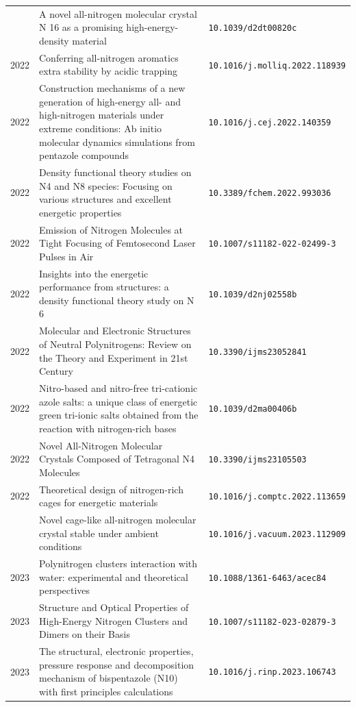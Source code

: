 \begin{longtable}{@{}p{1.0cm}p{10.5cm}p{3.5cm}@{}}
\addlinespace
2022 & A novel all-nitrogen molecular crystal N 16 as a promising high-energy-density material & \small\texttt{10.1039/d2dt00820c} \\
2022 & Conferring all-nitrogen aromatics extra stability by acidic trapping & \small\texttt{10.1016/j.molliq.2022.118939} \\
2022 & Construction mechanisms of a new generation of high-energy all- and high-nitrogen materials under extreme conditions: Ab initio molecular dynamics simulations from pentazole compounds & \small\texttt{10.1016/j.cej.2022.140359} \\
2022 & Density functional theory studies on N4 and N8 species: Focusing on various structures and excellent energetic properties & \small\texttt{10.3389/fchem.2022.993036} \\
2022 & Emission of Nitrogen Molecules at Tight Focusing of Femtosecond Laser Pulses in Air & \small\texttt{10.1007/s11182-022-02499-3} \\
2022 & Insights into the energetic performance from structures: a density functional theory study on N 6 & \small\texttt{10.1039/d2nj02558b} \\
2022 & Molecular and Electronic Structures of Neutral Polynitrogens: Review on the Theory and Experiment in 21st Century & \small\texttt{10.3390/ijms23052841} \\
2022 & Nitro-based and nitro-free tri-cationic azole salts: a unique class of energetic green tri-ionic salts obtained from the reaction with nitrogen-rich bases & \small\texttt{10.1039/d2ma00406b} \\
2022 & Novel All-Nitrogen Molecular Crystals Composed of Tetragonal N4 Molecules & \small\texttt{10.3390/ijms23105503} \\
2022 & Theoretical design of nitrogen-rich cages for energetic materials & \small\texttt{10.1016/j.comptc.2022.113659} \\
\addlinespace
2023 & Novel cage-like all-nitrogen molecular crystal stable under ambient conditions & \small\texttt{10.1016/j.vacuum.2023.112909} \\
2023 & Polynitrogen clusters interaction with water: experimental and theoretical perspectives & \small\texttt{10.1088/1361-6463/acec84} \\
2023 & Structure and Optical Properties of High-Energy Nitrogen Clusters and Dimers on their Basis & \small\texttt{10.1007/s11182-023-02879-3} \\
2023 & The structural, electronic properties, pressure response and decomposition mechanism of bispentazole (N10) with first principles calculations & \small\texttt{10.1016/j.rinp.2023.106743} \\

\end{longtable}
